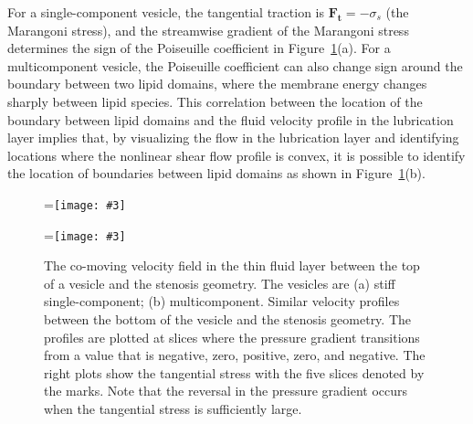 \documentclass[twoside,twocolumn,9pt]{article}
\renewcommand{\tt}{\mathbf{t}}
\newcommand{\subfigimg}[3][,]{%
  \setbox1=\hbox{\texttt{[image: \#3]}}%
  \leavevmode\rlap{\usebox1}%
  \rlap{\hspace*{0pt}\raisebox{\dimexpr\ht1-0\baselineskip}{\bf
  \normalsize #2}}%
  \phantom{\usebox1}%
}
\begin{document}
For a single-component vesicle,
the tangential traction is $\mathbf{F}_\tt =-\sigma_s$ (the Marangoni stress), and  the streamwise gradient 
of the Marangoni stress determines the sign of the Poiseuille coefficient in Figure~\ref{fig:BLvelocities}(a).
For a multicomponent vesicle, the Poiseuille coefficient can also change sign around the boundary 
between two lipid domains, where the membrane energy changes sharply between lipid species. 
This correlation between the location of the boundary between lipid domains and the fluid velocity profile in the lubrication layer
implies that, by visualizing the flow
in the lubrication layer and identifying locations where the nonlinear shear flow profile is convex, 
it is possible to identify the location of boundaries between lipid domains as shown in Figure~\ref{fig:BLvelocities}(b).

\begin{figure}
  \centering
  \subfigimg[width=\columnwidth]{(a)}{figures/SC_top.pdf}
  \subfigimg[width=\columnwidth]{(b)}{figures/MCp5_top.pdf}
  \caption{\label{fig:BLvelocities} \small The co-moving velocity field
  in the thin fluid layer between the top of a vesicle and the stenosis
  geometry. The vesicles are (a) stiff single-component; (b)
  multicomponent. Similar velocity profiles between the bottom of the
  vesicle and the stenosis geometry. The profiles are plotted at slices
  where the pressure gradient transitions from a value that is negative,
  zero, positive, zero, and negative. The right plots show the
  tangential stress with the five slices denoted by the marks. Note that
  the reversal in the pressure gradient occurs when the tangential
  stress is sufficiently large.}
\end{figure}


\end{document}
